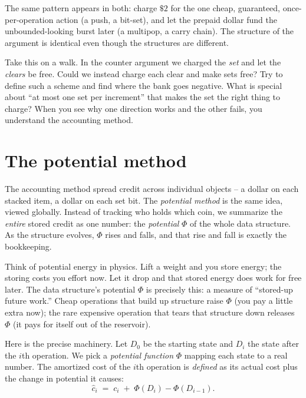 \begin{focusbox}
The same pattern appears in both: charge $\$2$ for the one cheap, guaranteed,
once-per-operation action (a push, a bit-set), and let the prepaid dollar fund the
unbounded-looking burst later (a multipop, a carry chain). The structure of the
argument is identical even though the structures are different.
\end{focusbox}

\begin{walkbox}
Take this on a walk. In the counter argument we charged the \emph{set} and let the
\emph{clears} be free. Could we instead charge each clear and make sets free?
Try to define such a scheme and find where the bank goes negative. What is special
about ``at most one set per increment'' that makes the set the right thing to
charge? When you see why one direction works and the other fails, you understand
the accounting method.
\end{walkbox}

\section{The potential method}

The accounting method spread credit across individual objects -- a dollar on each
stacked item, a dollar on each set bit. The \emph{potential method} is the same
idea, viewed globally. Instead of tracking who holds which coin, we summarize
the \emph{entire} stored credit as one number: the \emph{potential} $\Phi$ of the
whole data structure. As the structure evolves, $\Phi$ rises and falls, and that
rise and fall is exactly the bookkeeping.

\begin{intuitionbox}
Think of potential energy in physics. Lift a weight and you store energy; the
storing costs you effort now. Let it drop and that stored energy does work for
free later. The data structure's potential $\Phi$ is precisely this: a measure of
``stored-up future work.'' Cheap operations that build up structure raise $\Phi$
(you pay a little extra now); the rare expensive operation that tears that
structure down releases $\Phi$ (it pays for itself out of the reservoir).
\end{intuitionbox}

Here is the precise machinery. Let $D_0$ be the starting state and $D_i$ the state
after the $i$th operation. We pick a \emph{potential function} $\Phi$ mapping each
state to a real number. The amortized cost of the $i$th operation is \emph{defined}
as its actual cost plus the change in potential it causes:
\[
  \boxed{\;\hat{c}_i \;=\; c_i \;+\; \Phi(D_i) - \Phi(D_{i-1}).\;}
\]

